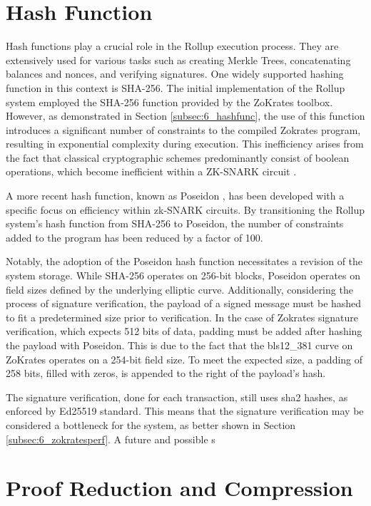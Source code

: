 \section{Hash Function}

Hash functions play a crucial role in the Rollup execution process. They are extensively used for various tasks such as creating Merkle Trees, concatenating balances and nonces, and verifying signatures. One widely supported hashing function in this context is SHA-256. The initial implementation of the Rollup system employed the SHA-256 function provided by the ZoKrates toolbox. However, as demonstrated in Section \ref{subsec:6_hashfunc}, the use of this function introduces a significant number of constraints to the compiled Zokrates program, resulting in exponential complexity during execution. This inefficiency arises from the fact that classical cryptographic schemes predominantly consist of boolean operations, which become inefficient within a ZK-SNARK circuit \cite{belles-munoz_twisted_2021}.

A more recent hash function, known as Poseidon \cite{grassi_poseidon_2021}, has been developed with a specific focus on efficiency within zk-SNARK circuits. By transitioning the Rollup system's hash function from SHA-256 to Poseidon, the number of constraints added to the program has been reduced by a factor of 100.

Notably, the adoption of the Poseidon hash function necessitates a revision of the system storage. While SHA-256 operates on 256-bit blocks, Poseidon operates on field sizes defined by the underlying elliptic curve. Additionally, considering the process of signature verification, the payload of a signed message must be hashed to fit a predetermined size prior to verification. In the case of Zokrates signature verification, which expects 512 bits of data, padding must be added after hashing the payload with Poseidon. This is due to the fact that the bls12\_381 curve on ZoKrates operates on a 254-bit field size. To meet the expected size, a padding of 258 bits, filled with zeros, is appended to the right of the payload's hash.

The signature verification, done for each transaction, still uses sha2 hashes, as enforced by Ed25519 standard. This means that the signature verification may be considered a bottleneck for the system, as better shown in Section \ref{subsec:6_zokratesperf}. A future and possible s

\section{Proof Reduction and Compression \label{sec:5_redandcompr}}

